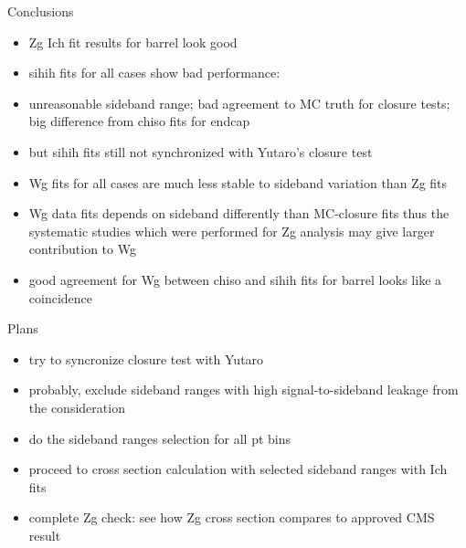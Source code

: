 \documentclass{beamer}
\begin{document}
\begin{frame}{Conclusions}
{
  \begin{itemize}
    \item Zg Ich fit results for barrel look good
    \item sihih fits for all cases show bad performance: 
    \item unreasonable sideband range; bad agreement to MC truth for closure tests; big difference from chiso fits for endcap
    \item but sihih fits still not synchronized with Yutaro's closure test 
    \item Wg fits for all cases are much less stable to sideband variation than Zg fits
    \item Wg data fits depends on sideband differently than MC-closure fits thus the systematic studies which were performed for Zg analysis may give larger contribution to Wg
    \item good agreement for Wg between chiso and sihih fits for barrel looks like a coincidence
  \end{itemize}
}
\end{frame} 

\begin{frame}{Plans}
{
  \begin{itemize}
    \item try to syncronize closure test with Yutaro
    \item probably, exclude sideband ranges with high signal-to-sideband leakage from the consideration
    \item do the sideband ranges selection for all pt bins
    \item proceed to cross section calculation with selected sideband ranges with Ich fits
    \item complete Zg check: see how Zg cross section compares to approved CMS result
  \end{itemize}
}
\end{frame} 
\end{document}
